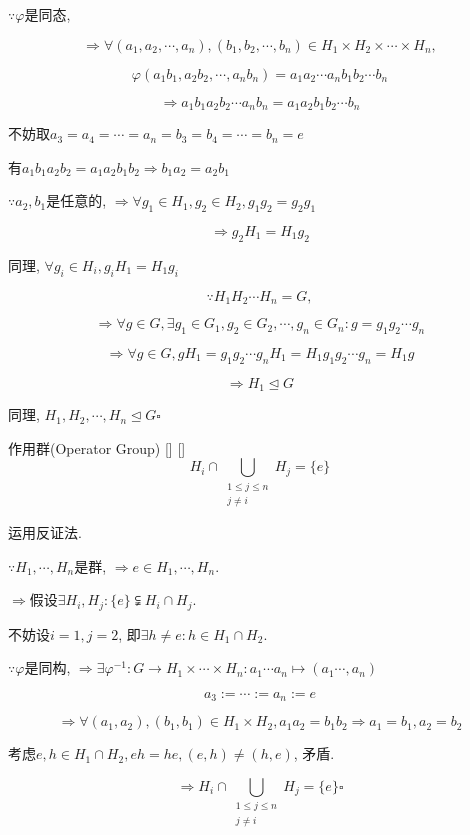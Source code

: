 \documentclass[UTF8]{ctexart}
\begin{document}
	\begin{prf}		
			$\because\varphi$是同态, 
			
			$$\Longrightarrow\forall (a_1,a_2,\cdots,a_n),(b_1,b_2,\cdots,b_n)\in H_1\times H_2\times\cdots\times H_n, $$
			
			$$\varphi(a_1b_1,a_2b_2,\cdots,a_nb_n)=a_1a_2\cdots a_nb_1b_2\cdots b_n$$
			
			$$\Longrightarrow a_1b_1a_2b_2\cdots a_nb_n=a_1a_2b_1b_2\cdots b_n$$
			
			不妨取$a_3=a_4=\cdots=a_n=b_3=b_4=\cdots=b_n=e$
			
			有$a_1b_1a_2b_2=a_1a_2b_1b_2\Longrightarrow b_1a_2=a_2b_1$
			
			$\because a_2,b_1$是任意的, $\Longrightarrow\forall g_1\in H_1,g_2\in H_2, g_1g_2=g_2g_1$
			
			$$\Longrightarrow g_2H_1=H_1g_2$$
			
			同理, $\forall g_i\in H_i, g_iH_1=H_1g_i$
			
			$$\because H_1H_2\cdots H_n=G, $$
			
			$$\Longrightarrow\forall g\in G, \exists g_1\in G_1,g_2\in G_2,\cdots,g_n\in G_n: g=g_1g_2\cdots g_n$$
			
			$$\Longrightarrow\forall g\in G, gH_1=g_1g_2\cdots g_nH_1=H_1g_1g_2\cdots g_n=H_1g$$
			
			$$\Longrightarrow H_1\trianglelefteq G$$
			
			同理, $H_1,H_2,\cdots,H_n\trianglelefteq G\square$
		\end{prf}
  
		\begin{ppt}
            []
            {作用群(Operator Group)}
            []
            []
			$$H_i\cap \bigcup_{\substack{1\leq j\leq n\\j\neq i}}H_j=\{e\}$$
		\end{ppt}
		
		\begin{prf}
			
			运用反证法. 
			
			$\because H_1,\cdots,H_n$是群, $\Longrightarrow e\in H_1,\cdots,H_n$. 
			
			$\Longrightarrow$假设$\exists H_i,H_j: \{e\}\subsetneqq H_i\cap H_j$. 
			
			不妨设$i=1,j=2$, 即$\exists h\neq e: h\in H_1\cap H_2$. 
			
			$\because\varphi$是同构, $\Longrightarrow\exists\varphi^{-1}:G\to H_1\times\cdots\times H_n: a_1\cdots a_n\mapsto (a_1\cdots,a_n)$
			
			$$a_3:=\cdots:=a_n:=e$$
			
			$$\Longrightarrow\forall (a_1,a_2),(b_1,b_1)\in H_1\times H_2, a_1a_2=b_1b_2\Longrightarrow a_1=b_1,a_2=b_2$$
			
			考虑$e,h\in H_1\cap H_2, eh=he, (e,h)\neq(h,e)$, 矛盾. 
			
			$$\Longrightarrow H_i\cap \bigcup_{\substack{1\leq j\leq n\\j\neq i}}H_j=\{e\}\square$$
		\end{prf}
  
\end{document}
